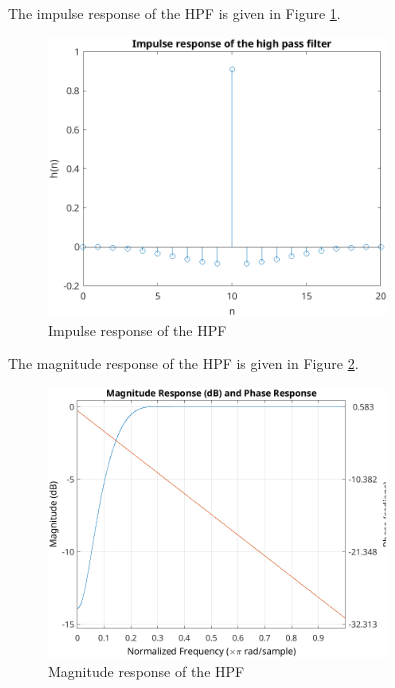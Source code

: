 \documentclass[a4paper,12pt]{article}
\begin{document}
The impulse response of the HPF is given in Figure \ref{fig:impulseHPF}.
\begin{figure}[h]
    \centering
    \includegraphics[width=0.8\textwidth]{figs/impulseHPF.png}
    \caption{Impulse response of the HPF}
    \label{fig:impulseHPF}
\end{figure}

The magnitude response of the HPF is given in Figure \ref{fig:magnitudeHPF}.
\begin{figure}[h]
    \centering
    \includegraphics[width=0.8\textwidth]{figs/magHPF.png}
    \caption{Magnitude response of the HPF}
    \label{fig:magnitudeHPF}
\end{figure}
\end{document}
